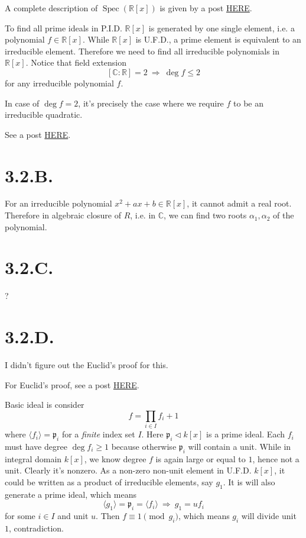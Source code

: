 A complete description of $\operatorname{Spec}(\mathbb R[x])$ is given by a post \href{https://math.stackexchange.com/questions/1057642/describe-the-topology-of-spec-mathbbrx}{HERE}.

To find all prime ideals in P.I.D. $\mathbb R[x]$ is generated by one single element, i.e. a polynomial $f\in \mathbb R[x]$. While $\mathbb R[x]$ is U.F.D., a prime element is equivalent to an irreducible element. Therefore we need to find all irreducible polynomials in $\mathbb R[x]$. Notice that field extension 
\[[\mathbb C:\mathbb R]=2 ~\Rightarrow~ \operatorname{deg} f\leq 2\] for any irreducible polynomial $f$. 

In case of $\operatorname{deg} f=2$, it's precisely the case where we require $f$ to be an irreducible quadratic. 

See a post \href{https://math.stackexchange.com/questions/2127249/what-are-the-irreducible-elements-in-mathbbrx-and-mathbbcx}{HERE}.

\section{3.2.B.}

For an irreducible polynomial $x^2+ax+b\in\mathbb R[x]$, it cannot admit a real root. Therefore in algebraic closure of $R$, i.e. in $\mathbb C$, we can find two roots $\alpha_1,\alpha_2$ of the polynomial. 

\section{3.2.C.}

?

\section{3.2.D.}

I didn't figure out the Euclid's proof for this. 

For Euclid's proof, see a post \href{https://math.stackexchange.com/questions/80389/ring-of-polynomials-over-a-field-has-infinitely-many-primes}{HERE}.

Basic ideal is consider 
\[f=\prod_{i\in I}f_i+1\]
where $\langle f_i\rangle=\mathfrak p_i$ for a \textit{finite} index set $I$. Here $\mathfrak p_i\triangleleft k[x]$ is a prime ideal. Each $f_i$ must have degree $\operatorname{deg}f_i\geq 1$ because otherwise $\mathfrak p_i$ will contain a unit. While in integral domain $k[x]$, we know degree $f$ is again large or equal to $1$, hence not a unit. Clearly it's nonzero. As a non-zero non-unit element in U.F.D. $k[x]$, it could be written as a product of irreducible elements, say $g_1$. It is will also generate a prime ideal, which means \[\langle g_1\rangle =\mathfrak p_i=\langle f_i\rangle ~\Rightarrow~ g_1=uf_i\] for some $i\in I$ and unit $u$. Then $f\equiv 1\pmod{g_i}$, which means $g_i$ will divide unit $1$, contradiction.

